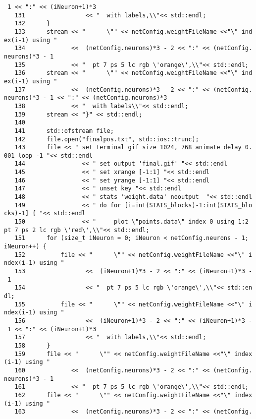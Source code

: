 \begin{verbatim}
 1 << ":" << (iNeuron+1)*3
   131                 << "  with labels,\\"<< std::endl;
   132      }
   133      stream << "      \"" << netConfig.weightFileName <<"\" ind
ex(i-1) using " 
   134             <<  (netConfig.neurons)*3 - 2 << ":" << (netConfig.
neurons)*3 - 1
   135             << "  pt 7 ps 5 lc rgb \'orange\',\\"<< std::endl;
   136      stream << "      \"" << netConfig.weightFileName <<"\" ind
ex(i-1) using " 
   137             <<  (netConfig.neurons)*3 - 2 << ":" << (netConfig.
neurons)*3 - 1 << ":" << (netConfig.neurons)*3
   138             << "  with labels\\"<< std::endl;
   139      stream << "}" << std::endl;
   140
   141      std::ofstream file;
   142      file.open("finalpos.txt", std::ios::trunc);
   143      file << " set terminal gif size 1024, 768 animate delay 0.
001 loop -1 "<< std::endl
   144                << " set output 'final.gif' "<< std::endl
   145                << " set xrange [-1:1] "<< std::endl
   146                << " set yrange [-1:1] "<< std::endl
   147                << " unset key "<< std::endl              
   148                << " stats 'weight.data' nooutput  "<< std::endl
   149                << " do for [i=int(STATS_blocks)-1:int(STATS_blo
cks)-1] { "<< std::endl
   150                << "     plot \"points.data\" index 0 using 1:2 
pt 7 ps 2 lc rgb \'red\',\\"<< std::endl;
   151      for (size_t iNeuron = 0; iNeuron < netConfig.neurons - 1; 
iNeuron++) {
   152          file << "      \"" << netConfig.weightFileName <<"\" i
ndex(i-1) using " 
   153                 <<  (iNeuron+1)*3 - 2 << ":" << (iNeuron+1)*3 -
 1
   154                 << "  pt 7 ps 5 lc rgb \'orange\',\\"<< std::en
dl;
   155          file << "      \"" << netConfig.weightFileName <<"\" i
ndex(i-1) using " 
   156                 <<  (iNeuron+1)*3 - 2 << ":" << (iNeuron+1)*3 -
 1 << ":" << (iNeuron+1)*3
   157                 << "  with labels,\\"<< std::endl;
   158      }
   159      file << "      \"" << netConfig.weightFileName <<"\" index
(i-1) using " 
   160             <<  (netConfig.neurons)*3 - 2 << ":" << (netConfig.
neurons)*3 - 1
   161             << "  pt 7 ps 5 lc rgb \'orange\',\\"<< std::endl;
   162      file << "      \"" << netConfig.weightFileName <<"\" index
(i-1) using " 
   163             <<  (netConfig.neurons)*3 - 2 << ":" << (netConfig.

\end{verbatim}
